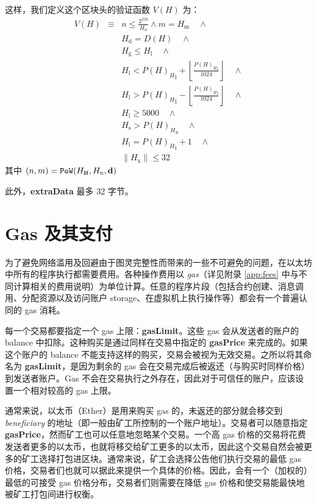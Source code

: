 \documentclass[9pt,oneside]{amsart}
\newcommand{\hcancel}[1]{%
    \tikz[baseline=(tocancel.base)]{
        \node[inner sep=0pt,outer sep=0pt] (tocancel) {#1};
        \draw[black] (tocancel.south west) -- (tocancel.north east);
    }%
}%
\begin{document}
\begin{multicols}{2}
\hypertarget{block_header_validity_function}{}这样，我们定义这个区块头的验证函数 $V(H)$ 为：
\begin{eqnarray}
V(H) & \equiv &  n \leqslant \frac{2^{256}}{H_{\mathrm{d}}} \wedge m = H_{\mathrm{m}} \quad \wedge \\
\nonumber & & H_{\mathrm{d}} = D(H) \quad \wedge \\
\nonumber& & H_{\mathrm{g}} \le H_{\mathrm{l}}  \quad \wedge \\
\nonumber& & H_{\mathrm{l}} < {P(H)_{H}}_{\mathrm{l}} + \left\lfloor\frac{{P(H)_{H}}_{\mathrm{l}}}{1024}\right\rfloor  \quad \wedge \\
\nonumber& & H_{\mathrm{l}} > {P(H)_{H}}_{\mathrm{l}} - \left\lfloor\frac{{P(H)_{H}}_{\mathrm{l}}}{1024}\right\rfloor  \quad \wedge \\
\nonumber& & H_{\mathrm{l}} \geqslant 5000  \quad \wedge \\
\nonumber& & H_{\mathrm{s}} > {P(H)_{H}}_{\mathrm{s}} \quad \wedge \\
\nonumber& & H_{\mathrm{i}} = {P(H)_{H}}_{\mathrm{i}} +1 \quad \wedge \\
\nonumber& & \lVert H_{\mathrm{x}} \rVert \le 32
\end{eqnarray}
其中 $(n, m) = \mathtt{PoW}(H_{\hcancel{n}}, H_{\mathrm{n}}, \mathbf{d})$

此外，\textbf{extraData} 最多 32 字节。

\section{Gas 及其支付} \label{ch:payment}

为了避免网络滥用及回避由于图灵完整性而带来的一些不可避免的问题，在以太坊中所有的程序执行都需要费用。各种操作费用以 \textit{gas}（详见附录 \ref{app:fees} 中与不同计算相关的费用说明）为单位计算。任意的程序片段（包括合约创建、消息调用、分配资源以及访问账户 storage、在虚拟机上执行操作等）都会有一个普遍认同的 gas 消耗。

每一个交易都要指定一个 gas 上限：\textbf{gasLimit}。这些 gas 会从发送者的账户的 balance 中扣除。这种购买是通过同样在交易中指定的 \textbf{gasPrice} 来完成的。如果这个账户的 balance 不能支持这样的购买，交易会被视为无效交易。之所以将其命名为 \textbf{gasLimit}，是因为剩余的 gas 会在交易完成后被返还（与购买时同样价格）到发送者账户。Gas 不会在交易执行之外存在，因此对于可信任的账户，应该设置一个相对较高的 gas 上限。

通常来说，以太币（Ether）是用来购买 gas 的，未返还的部分就会移交到 \textit{beneficiary} 的地址（即一般由矿工所控制的一个账户地址）。交易者可以随意指定 \textbf{gasPrice}，然而矿工也可以任意地忽略某个交易。一个高 gas 价格的交易将花费发送者更多的以太币，也就将移交给矿工更多的以太币，因此这个交易自然会被更多的矿工选择打包进区块。通常来说，矿工会选择公告他们执行交易的最低 gas 价格，交易者们也就可以据此来提供一个具体的价格。因此，会有一个（加权的）最低的可接受 gas 价格分布，交易者们则需要在降低 gas 价格和使交易能最快地被矿工打包间进行权衡。


\end{multicols}
\end{document}
